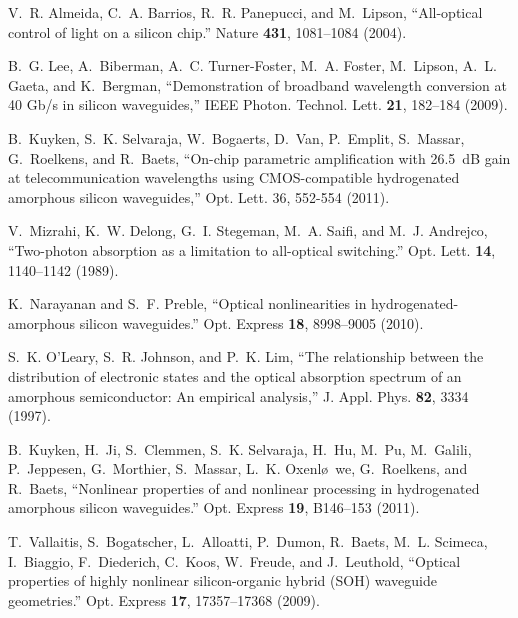 %
%

\begin{thebibliography}{10}
\newcommand{\enquote}[1]{``#1''}


V.~R. Almeida, C.~A. Barrios, R.~R. Panepucci, and M.~Lipson,
  \enquote{{All-optical control of light on a silicon chip.}} Nature
  \textbf{431}, 1081--1084 (2004).

B.~G. Lee, A.~Biberman, A.~C. Turner-Foster, M.~A. Foster, M.~Lipson, A.~L.
  Gaeta, and K.~Bergman, \enquote{{Demonstration of broadband wavelength
  conversion at 40 Gb/s in silicon waveguides},} IEEE Photon. Technol. Lett. \textbf{21}, 182--184 (2009).

B.~Kuyken, S.~K. Selvaraja, W.~Bogaerts, D.~Van, P.~Emplit, S.~Massar,
  G.~Roelkens, and R.~Baets, \enquote{{On-chip parametric amplification with 26.5~dB gain at telecommunication wavelengths using CMOS-compatible hydrogenated amorphous silicon waveguides},} Opt. Lett.  36, 552-554 (2011).

V.~Mizrahi, K.~W. Delong, G.~I. Stegeman, M.~A. Saifi, and M.~J. Andrejco,
  \enquote{{Two-photon absorption as a limitation to all-optical switching.}}
  Opt. Lett. \textbf{14}, 1140--1142 (1989).

K.~Narayanan and S.~F. Preble, \enquote{{Optical nonlinearities in
  hydrogenated-amorphous silicon waveguides.}} Opt. Express \textbf{18},
  8998--9005 (2010).

S.~K. O’Leary, S.~R. Johnson, and P.~K. Lim, \enquote{{The relationship
  between the distribution of electronic states and the optical absorption
  spectrum of an amorphous semiconductor: An empirical analysis},} J. Appl. Phys. \textbf{82}, 3334 (1997).

B.~Kuyken, H.~Ji, S.~Clemmen, S.~K. Selvaraja, H.~Hu, M.~Pu, M.~Galili,
  P.~Jeppesen, G.~Morthier, S.~Massar, L.~K. Oxenl\o~we, G.~Roelkens, and
  R.~Baets, \enquote{{Nonlinear properties of and nonlinear processing in
  hydrogenated amorphous silicon waveguides.}} Opt. Express \textbf{19},
  B146--153 (2011).

T.~Vallaitis, S.~Bogatscher, L.~Alloatti, P.~Dumon, R.~Baets, M.~L. Scimeca,
  I.~Biaggio, F.~Diederich, C.~Koos, W.~Freude, and J.~Leuthold,
  \enquote{{Optical properties of highly nonlinear silicon-organic hybrid (SOH)
  waveguide geometries.}} Opt. Express \textbf{17}, 17357--17368 (2009).


\end{thebibliography}

